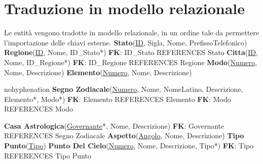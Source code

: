 \section{Traduzione in modello relazionale}
Le entità vengono tradotte in modello relazionale, in un ordine tale da permettere l'importazione delle chiavi esterne.\newline\newline
\textbf{Stato}(\underline{ID}, Sigla, Nome, PrefissoTelefonico)\newline\newline
\textbf{Regione}(\underline{ID}, Nome, ID\_Stato*)\newline
\textbf{FK}: ID\_Stato REFERENCES Stato\newline\newline
\textbf{Citta}(\underline{ID}, Nome, ID\_Regione*)\newline
\textbf{FK}: ID\_Regione REFERENCES Regione\newline\newline
\textbf{Modo}(\underline{Numero}, Nome, Descrizione)\newline\newline
\textbf{Elemento}(\underline{Numero}, Nome, Descrizione)\newline\newline
\begin{hyphenrules}{nohyphenation}
\textbf{Segno Zodiacale}(\underline{Numero}, Nome, NomeLatino, Descrizione, Elemento*, Modo*)\newline
\textbf{FK}: Elemento REFERENCES Elemento\newline
\textbf{FK}: Modo REFERENCES Modo\newline\newline
\end{hyphenrules}
\textbf{Casa Astrologica}(\underline{Governante}*, Nome, Descrizione)\newline
\textbf{FK}: Governante REFERENCES Segno Zodiacale\newline\newline
\textbf{Aspetto}(\underline{Angolo}, Nome, Descrizione)\newline\newline
\textbf{Tipo Punto}(\underline{Tipo})\newline\newline
\textbf{Punto Del Cielo}(\underline{Numero}, Nome, Descrizione, Tipo*)\newline
\textbf{FK}: Tipo REFERENCES Tipo Punto\newline\newline
